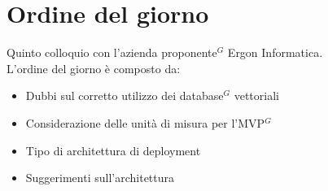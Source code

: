 \section*{Ordine del giorno}
Quinto colloquio con l'azienda proponente$^G$ Ergon Informatica.\\
L'ordine del giorno è composto da:
\begin{itemize}
	\item Dubbi sul corretto utilizzo dei database$^G$ vettoriali
	\item Considerazione delle unità di misura per l'MVP$^G$
	\item Tipo di architettura di deployment
	\item Suggerimenti sull'architettura
\end{itemize}